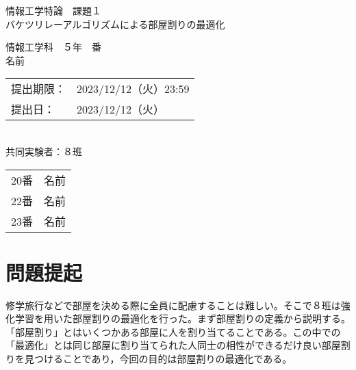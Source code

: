 \documentclass[titlepage]{ltjsreport}
\begin{document}
\makeatletter
\let\c@lstlisting=\c@figure
\makeatother
\begin{titlepage}
\vspace*{1em}
\begin{center}
\begin{huge}
情報工学特論　課題１
\\
\vspace{1em}
バケツリレーアルゴリズムによる部屋割りの最適化
\end{huge}
\end{center}
\vspace{6em}
\begin{flushright}
\begin{LARGE}
情報工学科　５年　番
\\
\vspace{1em}
名前
\end{LARGE}
\end{flushright}
\vspace{4em}
\begin{flushleft}
\begin{Large}
\begin{tabular}{ll}
提出期限： & 2023/12/12（火）23:59
\\
提出日： & 2023/12/12（火）
\\
\end{tabular}
\\
\vspace{2em}
共同実験者：８班
\\
\vspace{1em}
\begin{tabular}{ll}
20番 & 名前
\\
22番 & 名前
\\
23番 & 名前
\\
\end{tabular}
\end{Large}
\end{flushleft}
\end{titlepage}
\chapter{問題提起}
修学旅行などで部屋を決める際に全員に配慮することは難しい。そこで８班は強化学習を用いた部屋割りの最適化を行った。まず部屋割りの定義から説明する。「部屋割り」とはいくつかある部屋に人を割り当てることである。この中での「最適化」とは同じ部屋に割り当てられた人同士の相性ができるだけ良い部屋割りを見つけることであり，今回の目的は部屋割りの最適化である。
\end{document}
